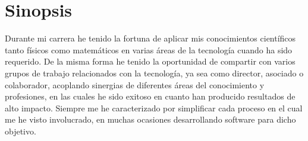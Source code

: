 \section{Sinopsis}

Durante mi carrera he tenido la fortuna de aplicar mis conocimientos
científicos tanto físicos como matemáticos en varias áreas de la tecnología
cuando ha sido requerido. De la misma forma he tenido la oportunidad de
compartir con varios grupos de trabajo relacionados con la tecnología,
ya sea como director, asociado o colaborador, acoplando sinergias de
diferentes áreas del conocimiento y profesiones, en las cuales he sido
exitoso en cuanto han producido resultados de alto impacto. Siempre
me he caracterizado por simplificar cada proceso en el cual me he visto
involucrado, en muchas ocasiones desarrollando software para dicho
objetivo.

